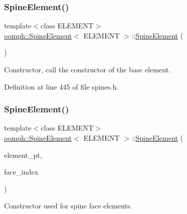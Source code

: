 \subsubsection{\texorpdfstring{Spine\+Element()}{SpineElement()}\hspace{0.1cm}{\footnotesize\ttfamily [1/2]}}
{\footnotesize\ttfamily template$<$class E\+L\+E\+M\+E\+NT$>$ \\
\hyperlink{classoomph_1_1SpineElement}{oomph\+::\+Spine\+Element}$<$ E\+L\+E\+M\+E\+NT $>$\+::\hyperlink{classoomph_1_1SpineElement}{Spine\+Element} (\begin{DoxyParamCaption}{ }\end{DoxyParamCaption})\hspace{0.3cm}{\ttfamily [inline]}}



Constructor, call the constructor of the base element. 



Definition at line 445 of file spines.\+h.

\mbox{\label{classoomph_1_1SpineElement_aaf749916e9365affb7bed85dcc129e74}} 
\subsubsection{\texorpdfstring{Spine\+Element()}{SpineElement()}\hspace{0.1cm}{\footnotesize\ttfamily [2/2]}}
{\footnotesize\ttfamily template$<$class E\+L\+E\+M\+E\+NT$>$ \\
\hyperlink{classoomph_1_1SpineElement}{oomph\+::\+Spine\+Element}$<$ E\+L\+E\+M\+E\+NT $>$\+::\hyperlink{classoomph_1_1SpineElement}{Spine\+Element} (\begin{DoxyParamCaption}\item[{\hyperlink{classoomph_1_1FiniteElement}{Finite\+Element} $\ast$const \&}]{element\+\_\+pt,  }\item[{const int \&}]{face\+\_\+index }\end{DoxyParamCaption})\hspace{0.3cm}{\ttfamily [inline]}}



Constructor used for spine face elements. 



